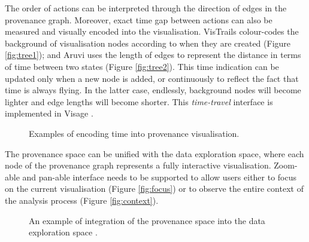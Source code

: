 The order of actions can be interpreted through the direction of edges in the provenance graph. Moreover, exact time gap between actions can also be measured and visually encoded into the visualisation. VisTrails \cite{Bavoil2005} colour-codes the background of visualisation nodes according to when they are created (Figure \ref{fig:tree1}); and Aruvi \cite{Shrinivasan2008} uses the length of edges to represent the distance in terms of time between two states (Figure \ref{fig:tree2}). This time indication can be updated only when a new node is added, or continuously to reflect the fact that time is always flying. In the latter case, endlessly, background nodes will become lighter and edge lengths will become shorter. This \textit{time-travel} interface is implemented in Visage \cite{Derthick2001}. %

\begin{figure}[ht]
\centering
{} \hspace{0.1cm}
\caption{Examples of encoding time into provenance visualisation.}
\label{fig:Action-TimeGap}
\end{figure}

The provenance space can be unified with the data exploration space, where each node of the provenance graph represents a fully interactive visualisation. Zoom-able and pan-able interface needs to be supported to allow users either to focus on the current visualisation  (Figure \ref{fig:focus}) or to observe the entire context of the analysis process (Figure \ref{fig:context}).

\begin{figure}[ht]
\centering
{} \hspace{0.1cm}
\caption{An example of integration of the provenance space into the data exploration space \cite{Dunne2012}.}
\label{fig:IntegratedView}
\end{figure}

